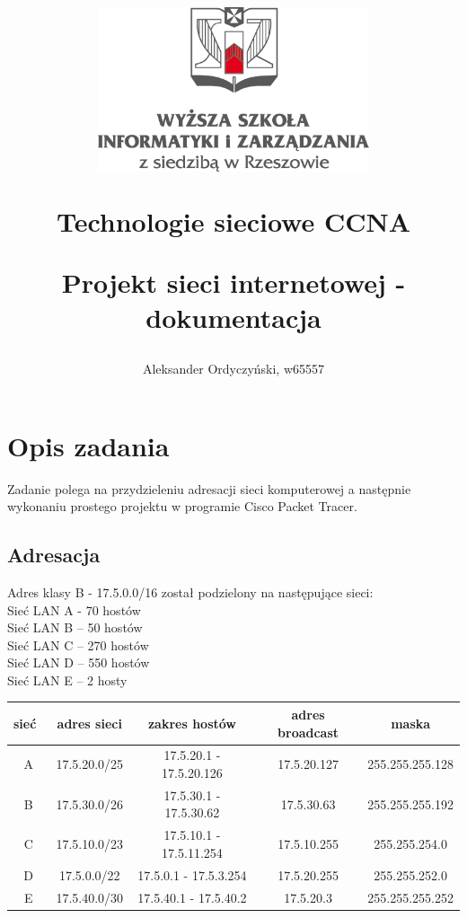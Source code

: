 \documentclass[12pt,a4paper]{article}
\begin{document}
\title{{
  \begin{center}
    \includegraphics[width=8cm]{wsiz}
  \end{center}
  \vspace{1.3cm}

  \LARGE Technologie sieciowe CCNA

  \LARGE Projekt sieci internetowej - dokumentacja}}

\author{{\Large Aleksander Ordyczyński, w65557}}
\date{}
\maketitle

\newpage
\section{Opis zadania}
Zadanie polega na przydzieleniu adresacji sieci komputerowej a następnie wykonaniu prostego projektu w programie Cisco Packet Tracer.
\subsection{Adresacja}
Adres klasy B - 17.5.0.0/16 został podzielony na następujące sieci:\\
Sieć LAN A - 70 hostów\\
Sieć LAN B – 50 hostów\\
Sieć LAN C – 270 hostów\\
Sieć LAN D – 550 hostów\\
Sieć LAN E – 2 hosty\\

    \begin{tabular}{|c|c|c|c|c|}
      \hline
      sieć & adres sieci &  zakres hostów  & adres broadcast & maska \\
      \hline
      A & 17.5.20.0/25 & 17.5.20.1 - 17.5.20.126  & 17.5.20.127  & 255.255.255.128  \\
      B & 17.5.30.0/26 & 17.5.30.1 - 17.5.30.62   & 17.5.30.63 & 255.255.255.192 \\
      C & 17.5.10.0/23 & 17.5.10.1 - 17.5.11.254  & 17.5.10.255 & 255.255.254.0 \\
      D & 17.5.0.0/22 & 17.5.0.1 - 17.5.3.254  & 17.5.20.255 & 255.255.252.0 \\
      E & 17.5.40.0/30 & 17.5.40.1 - 17.5.40.2   & 17.5.20.3 &  255.255.255.252 \\
      \hline
    \end{tabular}
\end{document}
